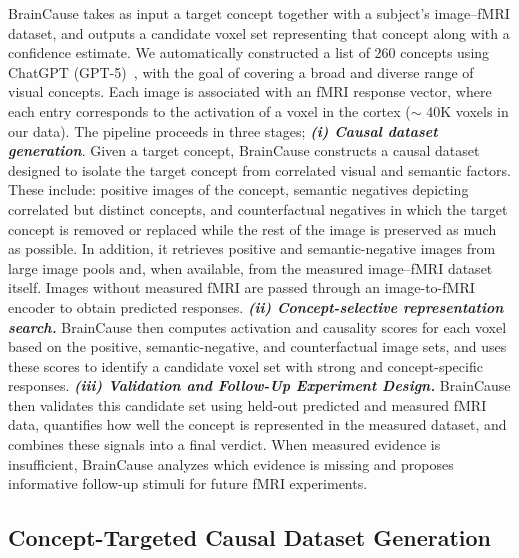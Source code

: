 \documentclass{llmxive}
\begin{document}
BrainCause takes as input a target concept together with a subject's image--fMRI dataset, and outputs a candidate voxel set representing that concept along with a confidence estimate. We automatically constructed a list of 260 concepts using ChatGPT (GPT-5)~\cite{openai2025gpt5systemcard}, with the goal of covering a broad and diverse range of visual concepts.
Each image is associated with an fMRI response vector, where each entry corresponds to the activation of a voxel in the cortex ($\sim$ 40K voxels in our data).
The pipeline proceeds in three stages; \textbf{\textit{(i) Causal dataset generation}}. Given a target concept, BrainCause constructs a causal dataset designed to isolate the target concept from correlated visual and semantic factors. These include: 
positive images of the concept, semantic negatives depicting correlated but distinct concepts, and counterfactual negatives in which the target concept is removed or replaced while the rest of the image is preserved as much as possible. In addition, it retrieves positive and semantic-negative images from large image pools and, when available, from the measured image--fMRI dataset itself. Images without measured fMRI are passed through an image-to-fMRI encoder to obtain predicted responses. \textbf{\emph{(ii) Concept-selective representation search.}} BrainCause then computes activation and causality scores for each voxel based on the positive, semantic-negative, and counterfactual image sets, and uses these scores to identify a candidate voxel set with strong and concept-specific responses. \textbf{\emph{(iii) Validation and Follow-Up Experiment Design.}} BrainCause then validates this candidate set using held-out predicted and measured fMRI data, quantifies how well the concept is represented in the measured dataset, and combines these signals into a final verdict. When measured evidence is insufficient, BrainCause analyzes which evidence is missing and proposes informative follow-up stimuli for future fMRI experiments. 

 
\subsection{Concept-Targeted Causal Dataset Generation}
\label{sec:method:Steps:Generation}
\end{document}
